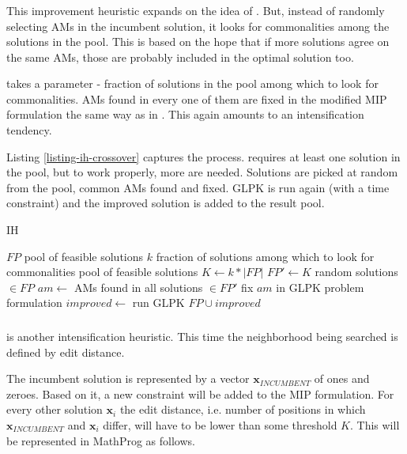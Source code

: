 \subsubsection{}

This improvement heuristic expands on the idea of . But, instead of randomly selecting AMs in the incumbent solution, it looks for commonalities among the solutions in the pool. This is based on the hope that if more solutions agree on the same AMs, those are probably included in the optimal solution too.

 takes a parameter - fraction of solutions in the pool among which to look for commonalities. AMs found in every one of them are fixed in the modified MIP formulation the same way as in . This again amounts to an intensification tendency.

Listing \ref{listing-ih-crossover} captures the process.  requires at least one solution in the pool, but to work properly, more are needed. Solutions are picked at random from the pool, common AMs found and fixed. GLPK is run again (with a time constraint) and the improved solution is added to the result pool.

\begin{algorithm}
\caption{ IH}
\label{listing-ih-crossover}
\begin{algorithmic}
\REQUIRE $FP$ pool of feasible solutions
\REQUIRE $k$ fraction of solutions among which to look for commonalities
\ENSURE pool of feasible solutions
\STATE $K \gets k * |FP|$
\STATE $FP' \gets K$ random solutions $\in FP$
\STATE $am \gets$ AMs found in all solutions $\in FP'$
\STATE fix $am$ in GLPK problem formulation
\STATE $improved \gets $ run GLPK
\RETURN $FP \cup improved$
\end{algorithmic}
\end{algorithm}

\subsubsection{}

 is another intensification heuristic. This time the neighborhood being searched is defined by edit distance.

The incumbent solution is represented by a vector $\mathbf{x}_{INCUMBENT}$ of ones and zeroes. Based on it, a new constraint will be added to the MIP formulation. For every other solution $\mathbf{x}_i$ the edit distance, i.e. number of positions in which $\mathbf{x}_{INCUMBENT}$ and $\mathbf{x}_i$ differ, will have to be lower than some threshold $K$. This will be represented in MathProg as follows.

